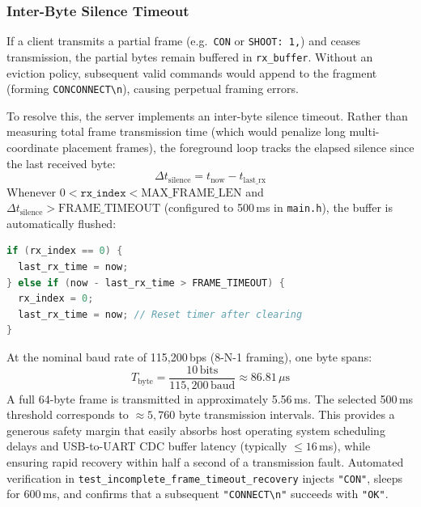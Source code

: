 \subsubsection{Inter-Byte Silence Timeout}
If a client transmits a partial frame (e.g.\ \texttt{CON} or \texttt{SHOOT: 1,}) and ceases transmission, the partial bytes remain buffered in \texttt{rx\_buffer}. Without an eviction policy, subsequent valid commands would append to the fragment (forming \texttt{CONCONNECT\textbackslash n}), causing perpetual framing errors. 

To resolve this, the server implements an inter-byte silence timeout. Rather than measuring total frame transmission time (which would penalize long multi-coordinate placement frames), the foreground loop tracks the elapsed silence since the last received byte:
\begin{equation}
\Delta t_{\text{silence}} = t_{\text{now}} - t_{\text{last\_rx}}
\end{equation}
Whenever $0 < \texttt{rx\_index} < \text{MAX\_FRAME\_LEN}$ and $\Delta t_{\text{silence}} > \text{FRAME\_TIMEOUT}$ (configured to 500\,ms in \texttt{main.h}), the buffer is automatically flushed:
\begin{lstlisting}[language=C]
if (rx_index == 0) {
  last_rx_time = now;
} else if (now - last_rx_time > FRAME_TIMEOUT) {
  rx_index = 0;
  last_rx_time = now; // Reset timer after clearing
}
\end{lstlisting}

At the nominal baud rate of 115,200\,bps (8-N-1 framing), one byte spans:
\begin{equation}
T_{\text{byte}} = \frac{10\,\text{bits}}{115{,}200\,\text{baud}} \approx 86.81\,\mu\text{s}
\end{equation}
A full 64-byte frame is transmitted in approximately 5.56\,ms. The selected 500\,ms threshold corresponds to $\approx 5{,}760$ byte transmission intervals. This provides a generous safety margin that easily absorbs host operating system scheduling delays and USB-to-UART CDC buffer latency (typically $\le 16$\,ms), while ensuring rapid recovery within half a second of a transmission fault. Automated verification in \texttt{test\_incomplete\_frame\_timeout\_recovery} injects \texttt{"CON"}, sleeps for 600\,ms, and confirms that a subsequent \texttt{"CONNECT\textbackslash n"} succeeds with \texttt{"OK"}.


